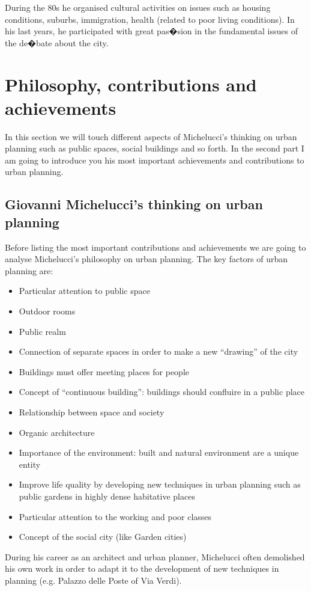 \documentclass[a4paper,11pt]{article}
\begin{document}
During the 80s he organised cultural activities on issues such as housing conditions, suburbs, immigration, health (related to poor living conditions). In his last years, he participated with great pas�sion in the fundamental issues of the de�bate about the city.

\section{Philosophy, contributions and achievements}
In this section we will touch different aspects of Michelucci's thinking on urban planning such as public spaces,
social buildings and so forth. In the second part I am going to introduce you his most important achievements and contributions to urban planning.

\subsection*{Giovanni Michelucci's thinking on urban planning}
Before listing the most important contributions and achievements we are going to analyse Michelucci's philosophy on urban planning.
The key factors of urban planning are:
\begin{itemize}
  \item Particular attention to public space
  \item Outdoor rooms
  \item Public realm
  \item Connection of separate spaces in order to make a new ``drawing'' of the city
  \item Buildings must offer meeting places for people
  \item Concept of ``continuous building'': buildings should confluire in a public place
  \item Relationship between space and society
  \item Organic architecture
  \item Importance of the environment: built and natural environment are a unique entity
  \item Improve life quality by developing new techniques in urban planning such as public gardens in highly dense habitative places
  \item Particular attention to the working and poor classes
  \item Concept of the social city (like Garden cities)
\end{itemize}

During his career as an architect and urban planner, Michelucci often demolished his own work in order to adapt it to the development
of new techniques in planning (e.g. Palazzo delle Poste of Via Verdi).
\end{document}
